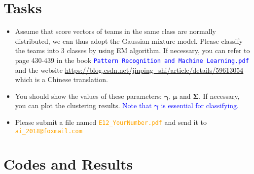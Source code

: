 ﻿\documentclass[a4paper, 11pt]{article}
\numberwithin{equation}{subsection}
\begin{document}
\section{Tasks}
\begin{itemize}
	\item Assume that score vectors of teams in the same class are normally distributed, we can thus adopt the Gaussian mixture model. Please classify the teams into 3 classes by using EM algorithm. If necessary, you can refer to page 430-439 in the book \textcolor{blue}{\texttt{Pattern Recognition and Machine Learning.pdf}} and the website \textcolor{	orange}{\url{https://blog.csdn.net/jinping_shi/article/details/59613054}} which is a Chinese translation.
	\item You should show the values of these parameters: $\boldsymbol\gamma$, $\boldsymbol\mu$ and $\boldsymbol\Sigma$. If necessary, you can plot the clustering results. \textcolor{blue}{Note that $\boldsymbol\gamma$ is essential for classifying.}
	\item Please submit a file named \textcolor{orange}{\texttt{E12\_YourNumber.pdf}} and send it to \textcolor{orange}{\texttt{ai\_2018@foxmail.com}}
\end{itemize}
\section{Codes and Results}


%
%
\end{document}
